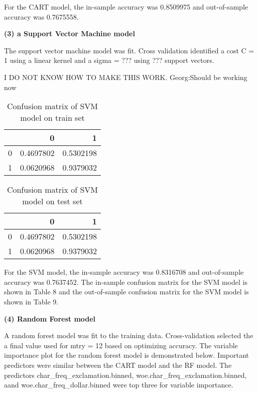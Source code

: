 \documentclass[12pt,]{article}
\begin{document}
For the CART model, the in-sample accuracy was 0.8509975 and
out-of-sample accuracy was 0.7675558.

\pagebreak

\textbf{(3) a Support Vector Machine model}

The support vector machine model was fit. Cross validation identified a
cost C = 1 using a linear kernel and a sigma = ??? using ??? support
vectors.

I DO NOT KNOW HOW TO MAKE THIS WORK. Georg:Should be working now

\begin{table}[t]

\caption{\label{tab:SVM train conf matrix}Confusion matrix of SVM model on train set}
\centering
\begin{tabular}{lrr}
\toprule
  & 0 & 1\\
\midrule
\rowcolor{gray!6}  0 & 0.4697802 & 0.5302198\\
1 & 0.0620968 & 0.9379032\\
\bottomrule
\end{tabular}
\end{table}

\begin{table}[t]

\caption{\label{tab:SVM test conf matrix}Confusion matrix of SVM model on test set}
\centering
\begin{tabular}{lrr}
\toprule
  & 0 & 1\\
\midrule
\rowcolor{gray!6}  0 & 0.4697802 & 0.5302198\\
1 & 0.0620968 & 0.9379032\\
\bottomrule
\end{tabular}
\end{table}

For the SVM model, the in-sample accuracy was 0.8316708 and
out-of-sample accuracy was 0.7637452. The in-sample confusion matrix for
the SVM model is shown in Table 8 and the out-of-sample confusion matrix
for the SVM model is shown in Table 9.

\textbf{(4) Random Forest model}

A random forest model was fit to the training data. Cross-validation
selected the a final value used for mtry = 12 based on optimizing
accuracy. The variable importance plot for the random forest model is
demonstrated below. Important predictors were similar between the CART
model and the RF model. The predictors char\_freq\_exclamation.binned,
woe.char\_freq\_exclamation.binned, aand woe.char\_freq\_dollar.binned
were top three for variable importance.
\end{document}
